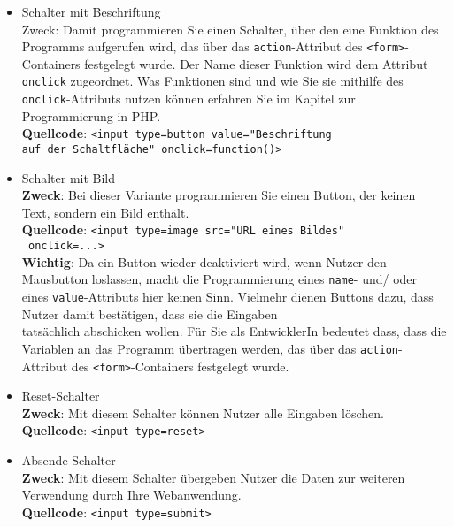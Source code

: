 \begin{itemize}
	\item Schalter mit Beschriftung\\	
	Zweck: Damit programmieren Sie einen Schalter, über den eine Funktion des Programms aufgerufen wird, das über das \verb|action|-Attribut des \verb|<form>|-Containers festgelegt wurde. Der Name dieser Funktion wird dem Attribut \verb|onclick| zugeordnet. Was Funktionen sind und wie Sie sie mithilfe des \verb|onclick|-Attributs nutzen können erfahren Sie im Kapitel zur Programmierung in PHP.\\
	\textbf{Quellcode}: \verb|<input type=button value="Beschriftung |\\\verb|auf der Schaltfläche" onclick=function()>|\\
		
	\item Schalter mit Bild\\	
	\textbf{Zweck}: Bei dieser Variante programmieren Sie einen Button, der keinen Text, sondern ein Bild enthält.\\	
	\textbf{Quellcode}: \verb|<input type=image src="URL eines Bildes"|\\\verb| onclick=...>|\\
	
	\textbf{Wichtig}: Da ein Button wieder deaktiviert wird, wenn Nutzer den Mausbutton loslassen, macht die Programmierung eines \verb|name|- und/ oder eines \verb|value|-Attributs hier keinen Sinn. Vielmehr dienen Buttons dazu, dass Nutzer damit bestätigen, dass sie die Eingaben \\tatsächlich abschicken wollen. Für Sie als EntwicklerIn bedeutet dass, dass die Variablen an das Programm übertragen werden, das über das \verb|action|-Attribut des \verb|<form>|-Containers festgelegt wurde.\\
	
	\item Reset-Schalter\\	
	\textbf{Zweck}: Mit diesem Schalter können Nutzer alle Eingaben löschen.\\	
	\textbf{Quellcode}: \verb|<input type=reset>|\\
	
	\item Absende-Schalter\\	
	\textbf{Zweck}: Mit diesem Schalter übergeben Nutzer die Daten zur weiteren Verwendung durch Ihre Webanwendung.\\	
	\textbf{Quellcode}: \verb|<input type=submit>|\\
	

\end{itemize}
